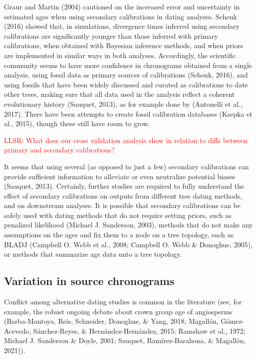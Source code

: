\documentclass[
  english,
  man]{apa6}
\begin{document}
Graur and Martin (2004) cautioned on the increased error and uncertainty in estimated ages when using secondary calibrations in dating analyses.
Schenk (2016) showed that, in simulations, divergence times inferred using secondary calibrations are significantly younger than those inferred with primary calibrations, when obtained with Bayesian inference methods, and when priors are implemented in similar ways in both analyses.
Accordingly, the scientific community seems to have more confidence in chronograms obtained from a single analysis, using fossil data as primary sources of calibrations (Schenk, 2016), and using fossils that have been widely discussed and curated as calibrations to date other trees, making sure that all data used in the analysis reflect a coherent evolutionary history (Sauquet, 2013), as for example done by (Antonelli et al., 2017).
There have been attempts to create fossil calibration databases (Ksepka et al., 2015), though these still have room to grow.

\textcolor{red}{LLSR: What does our cross validation analysis show in relation to diffs between primary and secondary calibrations?}

It seems that using several (as opposed to just a few) secondary calibrations can provide sufficient information to alleviate or even neutralize potential biases (Sauquet, 2013).
Certainly, further studies are required to fully understand the effect of secondary calibrations on outputs from different tree dating methods, and on downstream analyses. It is possible that secondary calibrations can be safely used with dating methods that do not require setting priors, such as penalized likelihood (Michael J. Sanderson, 2003), methods that do not make any assumptions on the ages and fix them to a node on a tree topology, such as BLADJ (Campbell O. Webb et al., 2008; Campbell O. Webb \& Donoghue, 2005), or methods that summarize age data unto a tree topology.

\hypertarget{variation-in-source-chronograms}{%
\subsection{Variation in source chronograms}\label{variation-in-source-chronograms}}

Conflict among alternative dating studies is common in the literature
(see, for example, the robust ongoing debate about crown group age of angiosperms (Barba-Montoya, Reis, Schneider, Donoghue, \& Yang, 2018; Magallón, Gómez-Acevedo, Sánchez-Reyes, \& Hernández-Hernández, 2015; Ramshaw et al., 1972; Michael J. Sanderson \& Doyle, 2001; Sauquet, Ramírez-Barahona, \& Magallón, 2021)).
\end{document}
